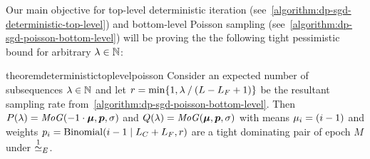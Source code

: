 Our main objective for top-level deterministic iteration (see~\cref{algorithm:dp-sgd-deterministic-top-level}) and bottom-level Poisson sampling (see~\cref{algorithm:dp-sgd-poisson-bottom-level}) will be proving the the following tight pessimistic bound for arbitrary $\lambda \in {\mathbb{N}}$:
\begin{restatable}{theorem}{deterministictoplevelpoisson}\label{theorem:deterministic_top_level_poisson}
    Consider an expected number of subsequences $\lambda \in \mathbb{N}$ and let $r = \min\{1, \lambda \mathbin{/} (L - L_F + 1)\}$ be the resultant sampling rate from~\cref{algorithm:dp-sgd-poisson-bottom-level}.
    Then 
    $P(\lambda) = \mathit{MoG}(-1 \cdot {\bm{\mu}}, {\bm{p}}, \sigma)$ and 
    $Q(\lambda) = \mathit{MoG}({\bm{\mu}}, {\bm{p}}, \sigma)$ with
    means ${\mu}_i = (i - 1)$ and 
    weights ${p}_i = \mathrm{Binomial}(i - 1 \mid L_C + L_F, r)$
    are a tight dominating pair of epoch $M$ under $\overset{1}{\simeq}_{E}$.
\end{restatable}

